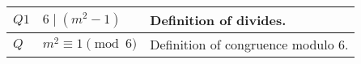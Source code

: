 \documentclass[11pt]{article}
\begin{document}
\begin{enumerate}
\begin{center}
\begin{tabular}[h]{|p{0.4in}|p{2in}|p{2.5in}|}
  $Q1$    &     $6 \mid \left( {m^2 - 1} \right)$     & Definition of divides.   \\  \hline  
  
  $Q$     &  $m^2 \equiv 1 \pmod 6$  &  Definition of congruence modulo 6.    \\ \hline
\end{tabular}
\end{center}

\end{enumerate}
\end{document}
